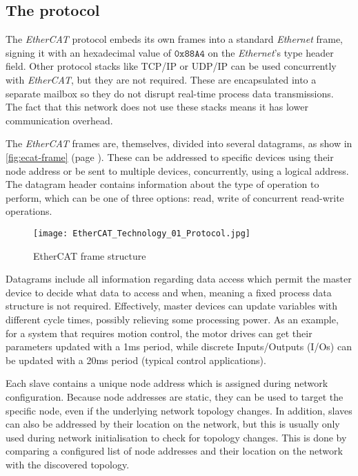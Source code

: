 \subsection{The protocol} \label{subsec:ecat-protocol}

The \emph{EtherCAT} protocol embeds its own frames into a standard \emph{Ethernet} frame, signing it with an hexadecimal value of $\mathtt{0x88A4}$ on the \emph{Ethernet}'s type header field.
Other protocol stacks like TCP/IP or UDP/IP can be used concurrently with \emph{EtherCAT}, but they are not required.
These are encapsulated into a separate mailbox so they do not disrupt real-time process data transmissions.
The fact that this network does not use these stacks means it has lower communication overhead.

The \emph{EtherCAT} frames are, themselves, divided into several datagrams, as show in \autoref{fig:ecat-frame} (page \pageref{fig:ecat-frame}).
These can be addressed to specific devices using their node address or be sent to multiple devices, concurrently, using a logical address.
The datagram header contains information about the type of operation to perform, which can be one of three options: read, write of concurrent read-write operations.

\begin{figure}[htp]
	\centering
	\texttt{[image: EtherCAT\_Technology\_01\_Protocol.jpg]}
	\caption{EtherCAT frame structure \cite{protocol:ethercat}}
	\label{fig:ecat-frame}
\end{figure}

Datagrams include all information regarding data access which permit the master device to decide what data to access and when, meaning a fixed process data structure is not required.
Effectively, master devices can update variables with different cycle times, possibly relieving some processing power.
As an example, for a system that requires motion control, the motor drives can get their parameters updated with a 1ms period, while discrete Inputs/Outputs (I/Os) can be updated with a 20ms period (typical control applications).

Each slave contains a unique node address which is assigned during network configuration.
Because node addresses are static, they can be used to target the specific node, even if the underlying network topology changes.
In addition, slaves can also be addressed by their location on the network, but this is usually only used during network initialisation to check for topology changes.
This is done by comparing a configured list of node addresses and their location on the network with the discovered topology.

